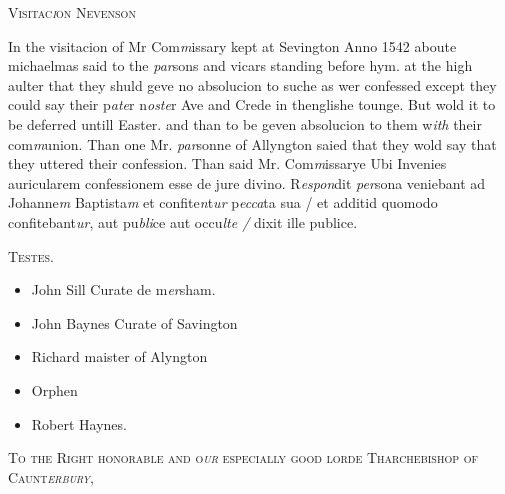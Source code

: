 \documentclass[12pt, a4paper]{book}
\begin{document}
				\begin{center} \begin{large} {\scshape Visitac\textit{i}on Nevenson} \end{large} \end{center}
			
            	
            	
            		
				\marginpar[\vspace{0.5cm}{\textcolor{Gray}{n}}]{}
			
            		
		\ifthenelse{\isodd{\thepage}}
		{\reversemarginpar}
		{\normalmarginpar}
		 In the visitacion of Mr Com\textit{m}issary kept at Sevington
 Anno 1542 aboute michaelmas said to the \textit{par}sons
 and vicars standing before hym. at the high aulter
 that they shuld geve no absolucion to suche as
 wer confessed except they could say their p\textit{ate}r n\textit{oste}r
 Ave and Crede in thenglishe tounge. But wold
  it to be deferred untill Easter. and than to be
 geven absolucion to them w\textit{ith} their com\textit{m}union.
            			Than one Mr. \textit{par}sonne of Allyngton saied that they
 wold say that they uttered their confession.
 Than said Mr. Com\textit{m}issarye Ubi Invenies
 auricularem confessionem esse de jure divino. R\textit{espon}dit
 \textit{per}sona veniebant ad Johanne\textit{m} Baptista\textit{m} et confite\textit{n}t\textit{ur}
 p\textit{ecca}ta sua / et additid quomodo confitebant\textit{ur}, aut
 pu\textit{bli}ce aut occu\textit{lte /} dixit ille publice.
            	

	\begin{center} {\scshape Testes.} \end{center}\begin{itemize}
		\item[]John Sill Curate de m\textit{er}sham.
		\item[]John Baynes Curate of Savington
		\item[]Richard maister of Alyngton
		\item[]Orphen
		\item[]Robert Haynes.\end{itemize}

 

            
            	
				\begin{center} \begin{large} {\scshape To the Right honorable and o\textit{ur} especially
            		good lorde Tharchebishop of Caunt\textit{erbury},
 } \end{large} \end{center}
			
\end{document}
